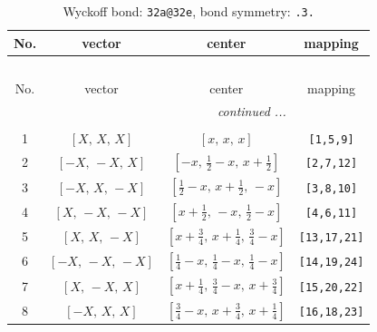 \documentclass[fleqn,8pt]{jsarticle}
\begin{document}
\begin{longtable}{cccc}
\caption{Wyckoff bond: {\tt 32a@32e}, bond symmetry: {\tt .3.}}
 \\
 \hline \hline
No. & vector & center & mapping \\ \hline \endfirsthead

\multicolumn{3}{l}{\tablename\ \thetable{}} \\
 \hline \hline
No. & vector & center & mapping \\ \hline \endhead

 \hline \hline
\multicolumn{3}{r}{\footnotesize\it continued ...} \\ \endfoot

 \hline \hline
\multicolumn{3}{r}{} \\ \endlastfoot

1 & $\left[ X,\, X,\, X \right]$ & $\left[ x,\, x,\, x \right]$ & {\tt [1,5,9]} \\ \hline
2 & $\left[ - X,\, - X,\, X \right]$ & $\left[ - x,\, \frac{1}{2} - x,\, x + \frac{1}{2} \right]$ & {\tt [2,7,12]} \\ \hline
3 & $\left[ - X,\, X,\, - X \right]$ & $\left[ \frac{1}{2} - x,\, x + \frac{1}{2},\, - x \right]$ & {\tt [3,8,10]} \\ \hline
4 & $\left[ X,\, - X,\, - X \right]$ & $\left[ x + \frac{1}{2},\, - x,\, \frac{1}{2} - x \right]$ & {\tt [4,6,11]} \\ \hline
5 & $\left[ X,\, X,\, - X \right]$ & $\left[ x + \frac{3}{4},\, x + \frac{1}{4},\, \frac{3}{4} - x \right]$ & {\tt [13,17,21]} \\ \hline
6 & $\left[ - X,\, - X,\, - X \right]$ & $\left[ \frac{1}{4} - x,\, \frac{1}{4} - x,\, \frac{1}{4} - x \right]$ & {\tt [14,19,24]} \\ \hline
7 & $\left[ X,\, - X,\, X \right]$ & $\left[ x + \frac{1}{4},\, \frac{3}{4} - x,\, x + \frac{3}{4} \right]$ & {\tt [15,20,22]} \\ \hline
8 & $\left[ - X,\, X,\, X \right]$ & $\left[ \frac{3}{4} - x,\, x + \frac{3}{4},\, x + \frac{1}{4} \right]$ & {\tt [16,18,23]} \\
\end{longtable}
\renewcommand{\arraystretch}{1.2}
\end{document}
